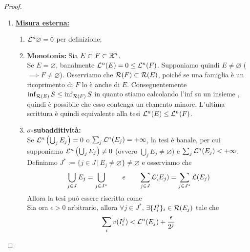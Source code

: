 \begin{proof}~
    \begin{enumerate}[label=\textbf{\Large\arabic*.}, ref=\textbf{\underline{(\arabic*)}}]
        \item \textbf{\underline{Misura esterna:}} 
        \begin{enumerate}[label=$\roman*)$]
            \item $\mathcal{L}^n\varnothing=0$ per definizione;
            \item \textbf{Monotonia: }Sia $E\subset F\subset \mathbb{R}^n$. \hspace{\fill}\\
            Se $E=\varnothing$, banalmente $\mathcal{L}^n(E)=0\leq \mathcal{L}^n(F)$. Supponiamo quindi $E\neq \varnothing$ ($\implies F\neq \varnothing$). Osserviamo che $\mathcal{R}(F)\subset \mathcal{R}(E)$, poiché se una famiglia è un ricoprimento di $F$ lo è anche di $E$. Conseguentemente $\inf _{\mathcal{R}(E)}S\leq \inf_{\mathcal{R}(F)}S$ in quanto stiamo calcolando l'inf su un insieme , quindi è possibile che esso contenga un elemento minore. L'ultima scrittura è quindi equivalente alla tesi $\mathcal{L}^n(E)\leq \mathcal{L}^n(F)$.
            \item \textbf{$\sigma$-subadditività:} \hspace{\fill}\\
            Se $\mathcal{L}^n\left(\bigcup\nolimits_jE_j\right)=0$ o $\sum\nolimits_j\mathcal{L}^n(E_j)=+\infty$, la tesi è banale, per cui supponiamo $\mathcal{L}^n\left(\bigcup\nolimits_jE_j\right)\neq 0$ (ovvero $\bigcup_jE_j\neq \varnothing$) e $\sum\nolimits_j\mathcal{L}^n(E_j)<+\infty$.\\
            Definiamo $J^*:=\{j\in J\,|\, E_j\neq \varnothing\}\neq \varnothing$ e osserviamo che 
            \[\bigcup_{j\in J}E_j=\bigcup_{j\in J^*} \qquad e \qquad \sum_{j\in J}\mathcal{L}(E_j)=\sum_{j\in J^*}\mathcal{L}(E_j)\] 
            Allora la tesi può essere riscritta come \hspace{\fill}\\
            Sia ora $\epsilon>0$ arbitrario, allora $\forall j\in J^*$, $\exists \{I^j_i\}_i\in \mathcal{R}(E_j)$ tale che \begin{equation}\label{eq: 1.6: 1}\sum_iv(I^j_i)<\mathcal{L}^n(E_j)+\frac{\epsilon}{2^j}\end{equation}

\end{enumerate}
\end{enumerate}
\end{proof}
